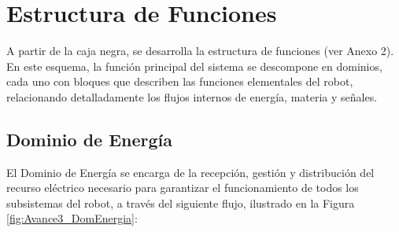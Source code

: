 \documentclass[../../General.tex]{subfiles}
\begin{document}
\section{Estructura de Funciones}

A partir de la caja negra, se desarrolla la estructura de funciones (ver Anexo 2). En este esquema, la función principal del sistema se descompone en dominios, cada uno con bloques que describen las funciones elementales del robot, relacionando detalladamente los flujos internos de energía, materia y señales.

\subsection{Dominio de Energía}
El Dominio de Energía se encarga de la recepción, gestión y distribución del recurso eléctrico necesario para garantizar el funcionamiento de todos los subsistemas del robot, a través del siguiente flujo, ilustrado en la Figura \ref{fig:Avance3_DomEnergia}:
\end{document}
